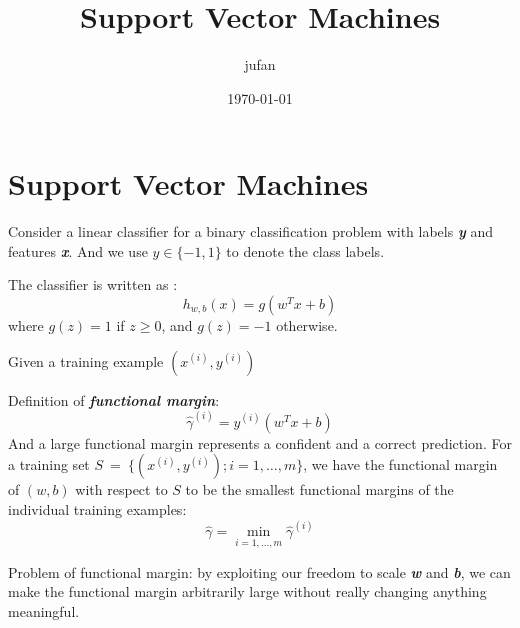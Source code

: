 \documentclass{article}
\begin{document}
\title{Support Vector Machines}\author{jufan}\date{\today}
\maketitle
\tableofcontents

\section{Support Vector Machines}
Consider a linear classifier for a binary classification problem with labels \emph{\textbf{y}} and features \emph{\textbf{x}}. And we use $y\in \{-1,1\}$ to denote the class labels.

The classifier is written as :
\begin{equation*}
h_{w,b}(x)=g(w^Tx+b)
\end{equation*}
where $g(z)=1$ if $z\geq0$, and $g(z)=-1$ otherwise.

Given a training example $(x^{(i)},y^{(i)})$

Definition of \emph{\textbf{functional margin}}:
\begin{equation*}
\hat{\gamma}^{(i)}=y^{(i)}(w^Tx+b)
\end{equation*}
And a large functional margin represents a confident and a correct prediction.
For a training set $S\ =\ \{(x^{(i)},y^{(i)});i=1,\ldots,m\}$, we have the functional margin of $(w,b)$ with respect to $S$ to be the smallest functional margins of the individual training examples:
\begin{equation*}
\hat{\gamma}=\min_{i=1,\ldots,m}\hat{\gamma}^{(i)}
\end{equation*}

Problem of functional margin: by exploiting our freedom to scale \emph{\textbf{w}} and \emph{\textbf{b}}, we can make the functional margin arbitrarily large without really changing anything meaningful.
\end{document}
